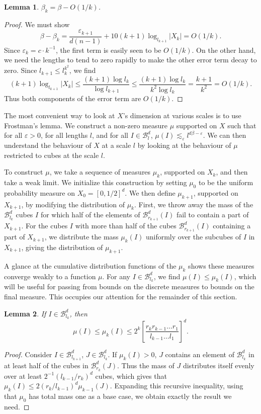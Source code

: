 \documentclass[usenames,dvipsnames]{article}
\theoremstyle{plain}
\newtheorem{lemma}{Lemma}
\theoremstyle{plain}
\begin{document}
\begin{lemma}
	$\beta_k = \beta - O(1/k)$.
\end{lemma}
\begin{proof}
	We must show
	\[ \beta - \beta_k = \frac{\varepsilon_{k+1}}{d(n-1)} + 10(k+1) \log_{l_{k+1}} |X_k| = O(1/k). \]
	Since $\varepsilon_k = c \cdot k^{-1}$, the first term is easily seen to be $O(1/k)$. On the other hand, we need the lengths to tend to zero rapidly to make the other error term decay to zero. Since $l_{k+1} \leq l_k^{k^2}$, we find
	\[ (k+1) \log_{l_{k+1}} |X_k| \leq \frac{(k+1) \log l_k}{\log l_{k+1}} \leq \frac{(k+1) \log l_k}{k^2 \log l_k} = \frac{k+1}{k^2} = O(1/k). \]
	Thus both components of the error term are $O(1/k)$.
\end{proof}

The most convenient way to look at $X$'s dimension at various scales is to use Frostman's lemma. We construct a non-zero measure $\mu$ supported on $X$ such that for all $\varepsilon > 0$, for all lengths $l$, and for all $I \in \mathcal{B}^d_l$, $\mu(I) \lesssim_\varepsilon l^{d\beta - \varepsilon}$. We can then understand the behaviour of $X$ at a scale $l$ by looking at the behaviour of $\mu$ restricted to cubes at the scale $l$.

To construct $\mu$, we take a sequence of measures $\mu_k$, supported on $X_k$, and then take a weak limit. We initialize this construction by setting $\mu_0$ to be the uniform probability measure on $X_0 = [0,1/2]^d$. We then define $\mu_{k+1}$, supported on $X_{k+1}$, by modifying the distribution of $\mu_k$. First, we throw away the mass of the $\mathcal{B}^d_{l_k}$ cubes $I$ for which half of the elements of $\mathcal{B}^d_{r_{k+1}}(I)$ fail to contain a part of $X_{k+1}$. For the cubes $I$ with more than half of the cubes $\mathcal{B}^d_{r_{k+1}}(I)$ containing a part of $X_{k+1}$, we distribute the mass $\mu_k(I)$ uniformly over the subcubes of $I$ in $X_{k+1}$, giving the distribution of $\mu_{k+1}$.

A glance at the cumulative distribution functions of the $\mu_k$ shows these measures converge weakly to a function $\mu$. For any $I \in \mathcal{B}^d_{l_k}$, we find $\mu(I) \leq \mu_k(I)$, which will be useful for passing from bounds on the discrete measures to bounds on the final measure. This occupies our attention for the remainder of this section.

\begin{lemma}
	If $I \in \mathcal{B}^d_{l_k}$, then
	\[ \mu(I) \leq \mu_k(I) \leq 2^k \left[ \frac{r_k r_{k-1} \dots r_1}{l_{k-1} \dots l_1} \right]^d. \]
\end{lemma}
\begin{proof}
	Consider $I \in \mathcal{B}^d_{l_{k+1}}$, $J \in \mathcal{B}^d_{l_k}$. If $\mu_k(I) > 0$, $J$ contains an element of $\mathcal{B}^d_{l_k}$ in at least half of the cubes in $\mathcal{B}^d_{r_k}(J)$. Thus the mass of $J$ distributes itself evenly over at least $2^{-1} (l_{k-1}/r_k)^d$ cubes, which gives that $\mu_k(I) \leq 2(r_k/l_{k-1})^d \mu_{k-1}(J)$. Expanding this recursive inequality, using that $\mu_0$ has total mass one as a base case, we obtain exactly the result we need.
\end{proof}
\end{document}
